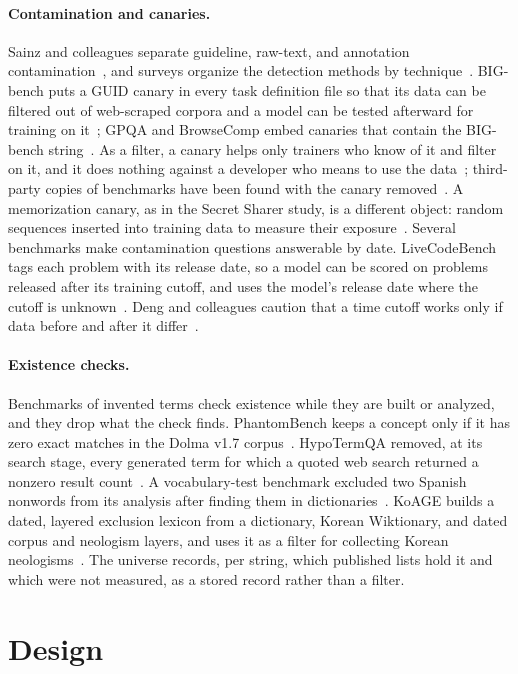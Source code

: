 \documentclass[11pt]{article}
\begin{document}
\paragraph{Contamination and canaries.} Sainz and colleagues separate guideline, raw-text, and
annotation contamination~\cite{sainz2023}, and surveys organize the detection methods by
technique~\cite{deng2024,xu2024}. BIG-bench puts a GUID canary in every task definition file so that its
data can be filtered out of web-scraped corpora and a model can be tested afterward for training on
it~\cite{srivastava2023}; GPQA and BrowseComp embed canaries that contain the BIG-bench
string~\cite{rein2024,wei2025}. As a filter, a canary helps only trainers who know of it and filter
on it, and it does nothing against a developer who means to use the data~\cite{chen2025}; third-party copies of
benchmarks have been found with the canary removed~\cite{han2025}. A memorization canary, as in the
Secret Sharer study, is a different object: random sequences inserted into training data to measure
their exposure~\cite{carlini2019}. Several benchmarks make contamination questions answerable by
date. LiveCodeBench tags each problem with its release date, so a model can be scored on problems
released after its training cutoff, and uses the model's release date where the cutoff is
unknown~\cite{jain2025}. Deng and colleagues caution that a time cutoff works only if data before and
after it differ~\cite{deng2024}.

\paragraph{Existence checks.} Benchmarks of invented terms check existence while they are built or
analyzed, and they drop what the check finds. PhantomBench keeps a concept only if it has zero exact
matches in the Dolma v1.7 corpus~\cite{jung2026}. HypoTermQA removed, at its search stage, every
generated term for which a quoted web search returned a nonzero result count~\cite{uluoglakci2024}. A vocabulary-test benchmark
excluded two Spanish nonwords from its analysis after finding them in dictionaries~\cite{martinez2024}.
KoAGE builds a dated, layered exclusion lexicon from a dictionary, Korean Wiktionary, and dated corpus
and neologism layers, and uses it as a filter for collecting Korean neologisms~\cite{kim2026koage}.
The universe records, per string, which published lists hold it and which were not measured, as a
stored record rather than a filter.

\section{Design}
\label{sec:design}
\end{document}
